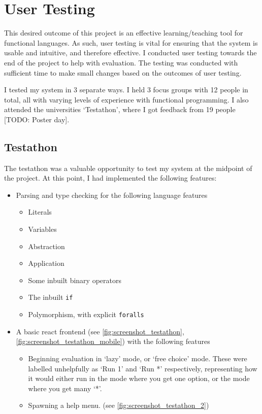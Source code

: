 \chapter{User Testing}
\label{chap:evaluation}

This desired outcome of this project is an effective learning/teaching tool for functional languages. As such, user testing is vital for ensuring that the system is usable and intuitive, and therefore effective. I conducted user testing towards the end of the project to help with evaluation. The testing was conducted with sufficient time to make small changes based on the outcomes of user testing.

I tested my system in 3 separate ways. I held 3 focus groups with 12 people in total, all with varying levels of experience with functional programming. I also attended the universities `Testathon', where I got feedback from 19 people [TODO: Poster day].



\section{Testathon}
The testathon was a valuable opportunity to test my system at the midpoint of the project. At this point, I had implemented the following features:

\begin{itemize}
    \item Parsing and type checking for the following language features
    \begin{itemize}
        \item Literals
        \item Variables
        \item Abstraction 
        \item Application
        \item Some inbuilt binary operators 
        \item The inbuilt \verb|if|
        \item Polymorphism, with explicit \verb|foralls|
    \end{itemize}
\item A basic react frontend (see \ref{fig:screenshot_testathon}, \ref{fig:screenshot_testathon_mobile}) with the following features
\begin{itemize}
    \item Beginning evaluation in `lazy' mode, or `free choice' mode. These were labelled unhelpfully as `Run 1' and `Run *' respectively, representing how it would either run in the mode where you get one option, or the mode where you get many `*'.
    \item Spawning a help menu. (see \ref{fig:screenshot_testathon_2})
\end{itemize}
\end{itemize}

